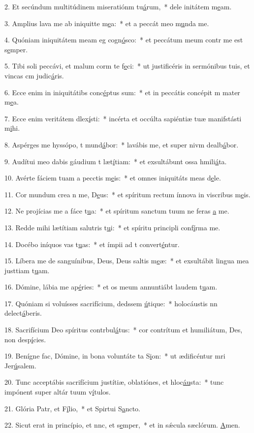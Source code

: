 2. Et secúndum multitúdinem miseratiónm tu\uline{á}rum,~* dele initátem m\uline{e}am.\par 
3. Amplius lava me ab iniquitte m\uline{e}a:~* et a peccát meo m\uline{u}nda me.\par 
4. Quóniam iniquitátem meam eg cogn\uline{ó}sco:~* et peccátum meum contr me est s\uline{e}mper.\par 
5. Tibi soli peccávi, et malum corm te f\uline{e}ci:~* ut justificéris in sermónibus tuis, et vincas cm judic\uline{á}ris.\par 
6. Ecce enim in iniquitátibs conc\uline{é}ptus sum:~* et in peccátis concépit m mater m\uline{e}a.\par 
7. Ecce enim veritátem dlex\uline{í}sti:~* incérta et occúlta sapiéntiæ tuæ manifstásti m\uline{i}hi.\par 
8. Aspérges me hyssópo, t mund\uline{á}bor:~* lavábis me, et super nivm dealb\uline{á}bor.\par 
9. Audítui meo dabis gáudium t læt\uline{í}tiam:~* et exsultábunt ossa hmili\uline{á}ta.\par 
10. Avérte fáciem tuam a pecctis m\uline{e}is:~* et omnes iniquitáts meas d\uline{e}le.\par 
11. Cor mundum crea n me, D\uline{e}us:~* et spíritum rectum ínnova in viscribus m\uline{e}is.\par 
12. Ne projícias me a fáce t\uline{u}a:~* et spíritum sanctum tuum ne feras \uline{a} me.\par 
13. Redde mihi lætítiam salutris t\uline{u}i:~* et spíritu principli conf\uline{í}rma me.\par 
14. Docébo iníquos vas t\uline{u}as:~* et ímpii ad t convert\uline{é}ntur.\par 
15. Líbera me de sanguínibus, Deus, Deus saltis m\uline{e}æ:~* et exsultábit lingua mea justtiam t\uline{u}am.\par 
16. Dómine, lábia me ap\uline{é}ries:~* et os meum annuntiábt laudem t\uline{u}am.\par 
17. Quóniam si voluísses sacrifícium, dedssem \uline{ú}tique:~* holocáustis nn delect\uline{á}beris.\par 
18. Sacrifícium Deo spíritus contrbul\uline{á}tus:~* cor contrítum et humiliátum, Des, non desp\uline{í}cies.\par 
19. Benígne fac, Dómine, in bona voluntáte ta S\uline{i}on:~* ut ædificéntur mri Jer\uline{ú}salem.\par 
20. Tunc acceptábis sacrifícium justítiæ, oblatiónes, et hloc\uline{áu}sta:~* tunc impónent super altár tuum v\uline{í}tulos.\par 
21. Glória Patr, et F\uline{í}lio,~* et Spirtui S\uline{a}ncto.\par 
22. Sicut erat in princípio, et nnc, et s\uline{e}mper,~* et in sǽcula sæclórum. \uline{A}men.\par 
